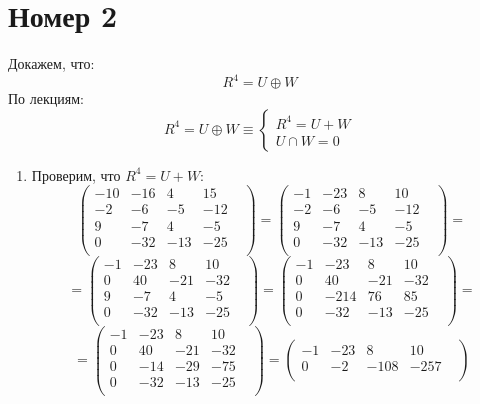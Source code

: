 \documentclass[a4paper,12pt]{article}
\begin{document}
\section*{Номер 2}
Докажем, что:
\[
R^4 = U \oplus W
\]
По лекциям:
\[
R^4 = U \oplus W \equiv \begin{cases}
R^4 =U  + W \\
U \cap W = 0
\end{cases}
\]
\begin{enumerate}
\item
Проверим, что $R^4 = U + W$:
\[
\begin{pmatrix}
-10 & -16 & 4 & 15 & \\
-2 & -6 & -5 & -12 & \\
9 & -7 & 4 & -5 & \\
0 & -32 & -13 & -25 & \\
\end{pmatrix}
=
\begin{pmatrix}
-1 & -23 & 8 & 10 & \\
-2 & -6 & -5 & -12 & \\
9 & -7 & 4 & -5 & \\
0 & -32 & -13 & -25 & \\
\end{pmatrix}
=
\]
\[
=
\begin{pmatrix}
-1 & -23 & 8 & 10 & \\
0 & 40 & -21 & -32 & \\
9 & -7 & 4 & -5 & \\
0 & -32 & -13 & -25 & \\
\end{pmatrix}
=
\begin{pmatrix}
-1 & -23 & 8 & 10 & \\
0 & 40 & -21 & -32 & \\
0 & -214 & 76 & 85 & \\
0 & -32 & -13 & -25 & \\
\end{pmatrix}
=
\]
\[
=
\begin{pmatrix}
-1 & -23 & 8 & 10 & \\
0 & 40 & -21 & -32 & \\
0 & -14 & -29 & -75 & \\
0 & -32 & -13 & -25 & \\
\end{pmatrix}
=
\begin{pmatrix}
-1 & -23 & 8 & 10 & \\
0 & -2 & -108 & -257 & \\

\end{pmatrix}\]
\end{enumerate}
\end{document}
